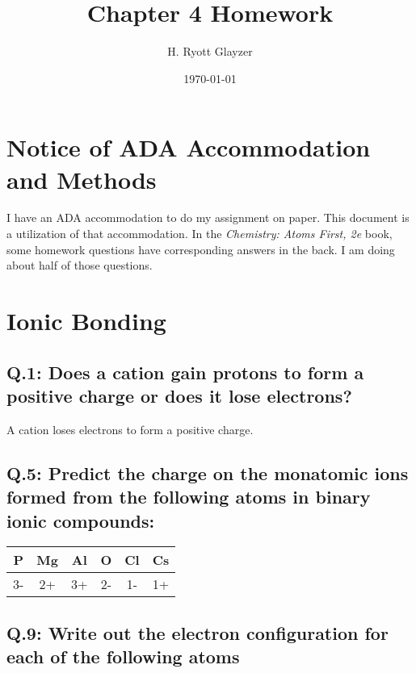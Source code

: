 \documentclass[11pt, letterpaper]{article}
\begin{document}


\title{Chapter 4 Homework}
\author{H. Ryott Glayzer}
\date{\today}


\maketitle

\section*{Notice of ADA Accommodation and Methods}
I have an ADA accommodation to do my assignment on paper.
This document is a utilization of that accommodation.
In the \textit{Chemistry: Atoms First, 2e} book,
some homework questions have corresponding answers in the back.
I am doing about half of those questions.

\section{Ionic Bonding}

\subsection*{Q.1: Does a cation gain protons to form a positive charge or does it lose electrons?}
A cation loses electrons to form a positive charge.

\subsection*{Q.5: Predict the charge on the monatomic ions formed
from the following atoms in binary ionic compounds:}

\begin{center}
	\begin{tabular}{|c|c|c|c|c|c|}
		\hline
		P & Mg & Al & O & Cl & Cs \\
		\hline
		3- & 2+ & 3+ & 2- & 1- & 1+ \\
		\hline		
	\end{tabular}
\end{center}


\subsection*{Q.9: Write out the electron configuration for each of the following atoms}
\end{document}
